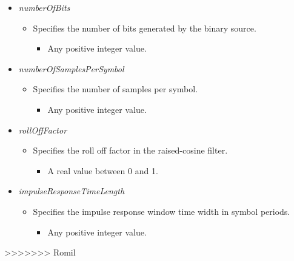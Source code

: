 \begin{itemize}
   \item  \emph{numberOfBits}
   \begin{itemize}
     \item  Specifies the number of bits generated by the binary source.
     \begin{itemize}
       \item Any positive integer value.
     \end{itemize}
   \end{itemize}
   
     \item  \emph{numberOfSamplesPerSymbol}
   \begin{itemize}
     \item  Specifies the number of samples per symbol.
     \begin{itemize}
       \item Any positive integer value.
     \end{itemize}
   \end{itemize}
   
   \item  \emph{rollOffFactor}
   \begin{itemize}
     \item  Specifies the roll off factor in the raised-cosine filter.
     \begin{itemize}
       \item A real value between 0 and 1.
     \end{itemize}
   \end{itemize}
   
      \item  \emph{impulseResponseTimeLength}
   \begin{itemize}
     \item  Specifies the impulse response window time width in symbol periods.
     \begin{itemize}
       \item Any positive integer value.
     \end{itemize}
   \end{itemize}
   
 \end{itemize}

>>>>>>> Romil
